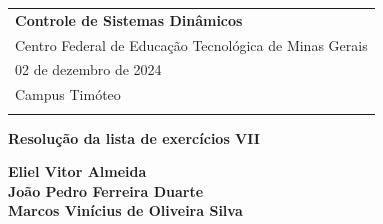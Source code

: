 \documentclass[a4paper,12pt]{article}
\begin{document}

    \thispagestyle{empty} %

    \begin{tabular}{p{15.5cm}}
    {\large \textbf{Controle de Sistemas Dinâmicos} } \\
    Centro Federal de Educação Tecnológica de Minas Gerais \\
    02 de dezembro de 2024 \\ Campus Timóteo \\
    \hline
    \\
    \end{tabular}

    \vspace*{0.3cm}

    \begin{center}
    {\Large \textbf{Resolução da lista de exercícios VII}}
        \vspace{2mm}

        {\textbf{Eliel Vitor Almeida \\ João Pedro Ferreira Duarte \\ Marcos Vinícius de Oliveira Silva }}
    \end{center}

    \vspace{0.4cm}

\end{document}
